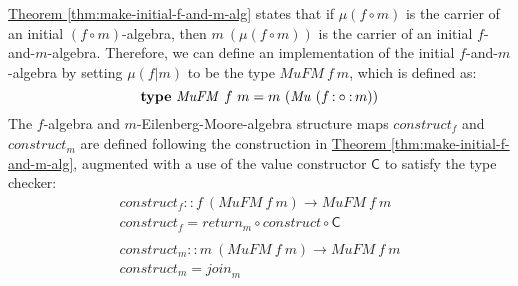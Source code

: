 \documentclass{jfp1}
\newcommand{\thmref}[1]{\hyperref[#1]{Theorem \ref*{#1}}}
\newcommand{\kw}[1]{\textbf{#1}}
\begin{document}
\thmref{thm:make-initial-f-and-m-alg} states that if $\mu(f \circ m)$
is the carrier of an initial $(f \circ m)$-algebra, then $m~(\mu(f
\circ m))$ is the carrier of an initial
$f$-and-$m$-algebra. Therefore, we can define an implementation of the
initial $f$-and-$m$-algebra by setting $\mu (f|m)$ to be the type
$\mathit{MuFM}~f~m$, which is defined as:
\begin{displaymath}
  \kw{type}~\mathit{MuFM}~f~m = m~(\mathit{Mu}~(f \fcompose m))
\end{displaymath}
The $f$-algebra and $m$-Eilenberg-Moore-algebra structure maps
$\mathit{construct_f}$ and $\mathit{construct_m}$ are defined
following the construction in \thmref{thm:make-initial-f-and-m-alg},
augmented with a use of the value constructor $\mathsf{C}$ to satisfy
the type checker:
\begin{displaymath}
  \begin{array}{l}
    \mathit{construct}_f :: f~(\mathit{MuFM}~f~m) \to \mathit{MuFM}~f~m \\
    \mathit{construct}_f = \mathit{return}_m \circ \mathit{construct} \circ \mathsf{C} \\
    \\
    \mathit{construct}_m :: m~(\mathit{MuFM}~f~m) \to \mathit{MuFM}~f~m \\
    \mathit{construct}_m = \mathit{join}_m
  \end{array}
\end{displaymath}
\end{document}
